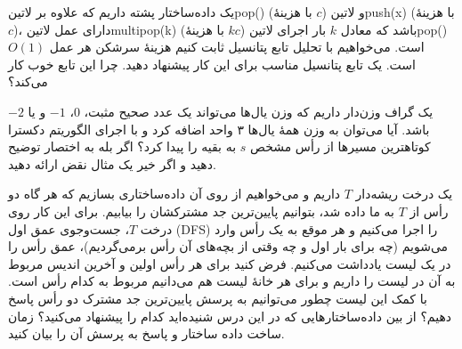 
یک داده‌ساختار پشته داریم که علاوه بر ‌لاتین{pop()} (با هزینۀ $c$) و ‌لاتین{push(x)} (با هزینۀ $c$)، دارای عمل ‌لاتین{multipop(k)} (با هزینۀ $kc$) باشد که معادل $k$ بار اجرای ‌لاتین{pop()} است. می‌خواهیم با تحلیل تابع پتانسیل ثابت کنیم هزینۀ سرشکن هر عمل $O(1)$ است. یک تابع پتانسیل مناسب برای این کار پیشنهاد دهید.
چرا این تابع خوب کار می‌کند؟


یک گراف وزن‌دار داریم که وزن یال‌ها می‌تواند یک عدد صحیح مثبت، $0$، $-1$ و یا $-2$ باشد. آیا می‌توان به وزن همۀ یال‌ها ۳ واحد اضافه کرد و با اجرای الگوریتم دکسترا کوتاهترین مسیرها از رأس مشخص $s$ به بقیه را پیدا کرد؟ اگر بله به اختصار توضیح دهید و اگر خیر یک مثال نقض ارائه دهید.


یک درخت ریشه‌دار $T$ داریم و می‌خواهیم از روی آن داده‌ساختاری بسازیم که هر گاه دو رأس از $T$ به ما داده شد، بتوانیم پایین‌ترین جد مشترکشان را بیابیم. برای این کار روی درخت $T$، جست‌وجوی عمق اول (DFS) را اجرا می‌کنیم و هر موقع به یک رأس وارد می‌شویم (چه برای بار اول و چه وقتی از بچه‌های آن رأس برمی‌گردیم)، عمق رأس را در یک لیست یادداشت می‌کنیم. فرض کنید برای هر رأس اولین و آخرین اندیس مربوط به آن در لیست را داریم و برای هر خانۀ لیست هم می‌دانیم مربوط به کدام رأس است. با کمک این لیست چطور می‌توانیم به پرسش پایین‌ترین جد مشترک دو رأس پاسخ دهیم؟ از بین داده‌ساختارهایی که در این درس شنیده‌اید کدام را پیشنهاد می‌کنید؟ زمان ساخت داده ساختار و پاسخ به پرسش آن را بیان کنید.


